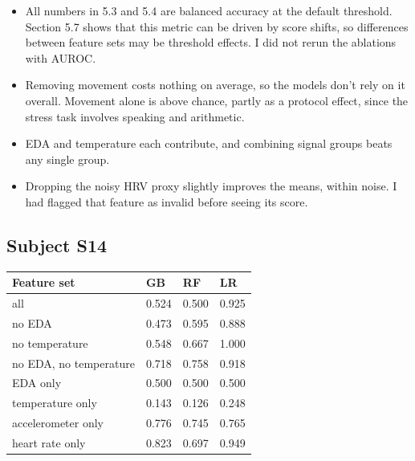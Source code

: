 \documentclass[11pt]{article}
\providecommand{\tightlist}{\setlength{\itemsep}{2pt}\setlength{\parskip}{0pt}}
\begin{document}
\begin{itemize}
\tightlist
\item
  All numbers in 5.3 and 5.4 are balanced accuracy at the default
  threshold. Section 5.7 shows that this metric can be driven by score
  shifts, so differences between feature sets may be threshold effects.
  I did not rerun the ablations with AUROC.
\item
  Removing movement costs nothing on average, so the models don't rely
  on it overall. Movement alone is above chance, partly as a protocol
  effect, since the stress task involves speaking and arithmetic.
\item
  EDA and temperature each contribute, and combining signal groups beats
  any single group.
\item
  Dropping the noisy HRV proxy slightly improves the means, within
  noise. I had flagged that feature as invalid before seeing its score.
\end{itemize}

\hypertarget{subject-s14}{%
\subsection{Subject S14}\label{subject-s14}}

\begin{longtable}[]{@{}llll@{}}
\toprule\noalign{}
Feature set & GB & RF & LR \\
\midrule\noalign{}
\endhead
\bottomrule\noalign{}
\endlastfoot
all & 0.524 & 0.500 & 0.925 \\
no EDA & 0.473 & 0.595 & 0.888 \\
no temperature & 0.548 & 0.667 & 1.000 \\
no EDA, no temperature & 0.718 & 0.758 & 0.918 \\
EDA only & 0.500 & 0.500 & 0.500 \\
temperature only & 0.143 & 0.126 & 0.248 \\
accelerometer only & 0.776 & 0.745 & 0.765 \\
heart rate only & 0.823 & 0.697 & 0.949 \\
\end{longtable}
\end{document}
